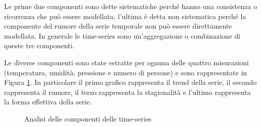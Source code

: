 \documentclass{article}
\begin{document}
Le prime due componenti sono dette sistematiche perché hanno una consistenza o ricorrenza che può essere modellata, l'ultima è detta non sistematica perché la componente del rumore della serie temporale non può essere direttamente modellata. In generale le time-series sono un'aggregazione o combinazione di queste tre componenti.

Le diverse componenti sono state estratte per ognuna delle quattro misurazioni (temperatura, umidità, pressione e numero di persone) e sono rappresentate in Figura \ref{fig:componenti}. In particolare il primo grafico rappresenta il trend della serie, il secondo rappresenta il rumore, il terzo rappresenta la stagionalità e l'ultimo rappresenta la forma effettiva della serie.

\begin{figure}
    \centering
    \qquad
    \qquad
    \qquad
    \caption{Analisi delle componenti delle time-series}
    \label{fig:componenti}
\end{figure}
\end{document}
